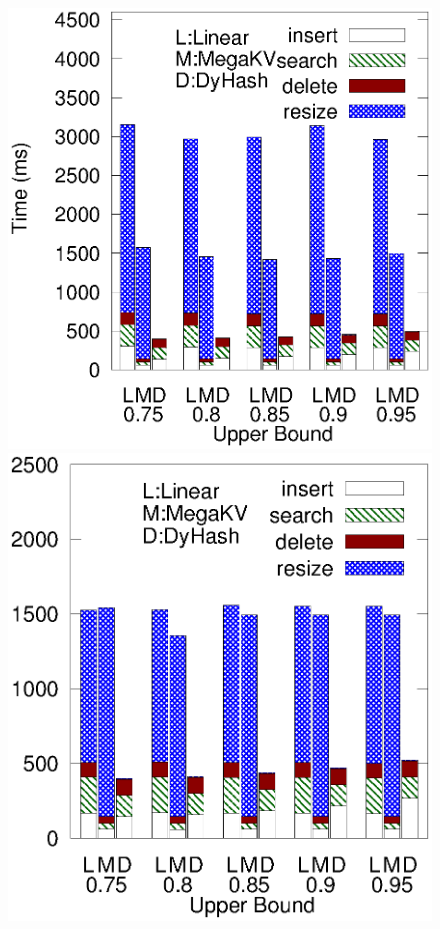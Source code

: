 \begin{figure}[htp]
	\begin{minipage}{0.19\linewidth}\centering
		\includegraphics[width=\linewidth]{pic/dynamic/twitter/diff_upper.eps}
		\centerline{\dstwitter}
	\end{minipage}
	\begin{minipage}{0.19\linewidth}\centering
		\includegraphics[width=\linewidth]{pic/dynamic/reddit/diff_upper.eps}

\end{minipage}
\end{figure}
